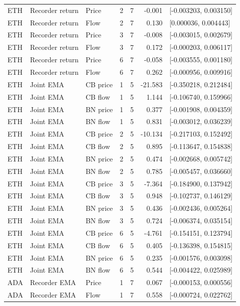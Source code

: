{\begin{longtable}{lllrrrl}
ETH & Recorder return & Price & 2 & 7 & -0.001 & [-0.003203, 0.003150]\\
ETH & Recorder return & Flow & 2 & 7 & 0.130 & [0.000036, 0.004443]\\
ETH & Recorder return & Price & 3 & 7 & -0.008 & [-0.003015, 0.002679]\\
ETH & Recorder return & Flow & 3 & 7 & 0.172 & [-0.000203, 0.006117]\\
ETH & Recorder return & Price & 6 & 7 & -0.058 & [-0.003555, 0.001180]\\
ETH & Recorder return & Flow & 6 & 7 & 0.262 & [-0.000956, 0.009916]\\
ETH & Joint EMA & CB price & 1 & 5 & -21.583 & [-0.350218, 0.212484]\\
ETH & Joint EMA & CB flow & 1 & 5 & 1.144 & [-0.106740, 0.159966]\\
ETH & Joint EMA & BN price & 1 & 5 & 0.377 & [-0.001908, 0.004359]\\
ETH & Joint EMA & BN flow & 1 & 5 & 0.831 & [-0.003012, 0.036239]\\
ETH & Joint EMA & CB price & 2 & 5 & -10.134 & [-0.217103, 0.152492]\\
ETH & Joint EMA & CB flow & 2 & 5 & 0.895 & [-0.113647, 0.154838]\\
ETH & Joint EMA & BN price & 2 & 5 & 0.474 & [-0.002668, 0.005742]\\
ETH & Joint EMA & BN flow & 2 & 5 & 0.785 & [-0.005457, 0.036660]\\
ETH & Joint EMA & CB price & 3 & 5 & -7.364 & [-0.184900, 0.137942]\\
ETH & Joint EMA & CB flow & 3 & 5 & 0.948 & [-0.102737, 0.146129]\\
ETH & Joint EMA & BN price & 3 & 5 & 0.436 & [-0.002436, 0.005264]\\
ETH & Joint EMA & BN flow & 3 & 5 & 0.724 & [-0.006374, 0.035154]\\
ETH & Joint EMA & CB price & 6 & 5 & -4.761 & [-0.154151, 0.123794]\\
ETH & Joint EMA & CB flow & 6 & 5 & 0.405 & [-0.136398, 0.154815]\\
ETH & Joint EMA & BN price & 6 & 5 & 0.235 & [-0.001576, 0.003098]\\
ETH & Joint EMA & BN flow & 6 & 5 & 0.544 & [-0.004422, 0.025989]\\
ADA & Recorder EMA & Price & 1 & 7 & 0.067 & [-0.000153, 0.000556]\\
ADA & Recorder EMA & Flow & 1 & 7 & 0.558 & [-0.000724, 0.022762]\\

\end{longtable}}
